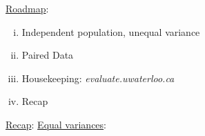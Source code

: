 \underline{Roadmap}:
\begin{enumerate}[(i)]
    \item Independent population, unequal variance
    \item Paired Data
    \item Housekeeping: \emph{evaluate.uwaterloo.ca}
    \item Recap
\end{enumerate}

\underline{Recap}: \underline{Equal variances}:
